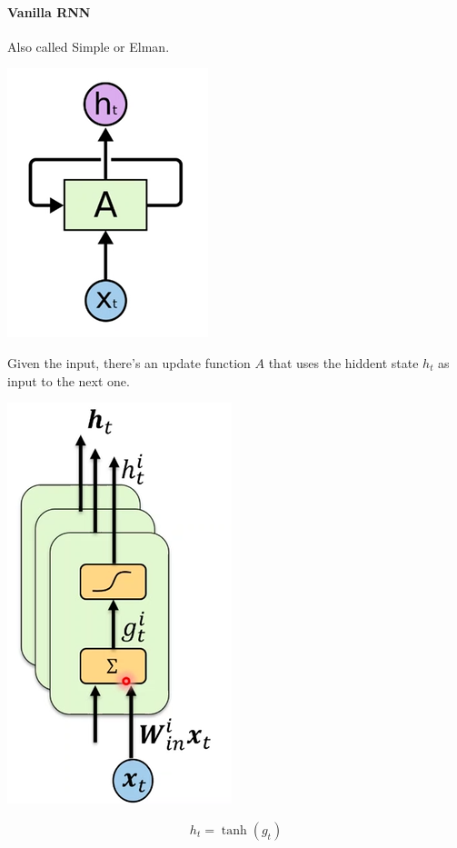 \documentclass[10pt]{report}
\begin{document}
\paragraph{Vanilla RNN} Also called Simple or Elman.
\begin{center}
	\includegraphics[scale=0.5]{90.png}
\end{center}
Given the input, there's an update function $A$ that uses the hiddent state $h_t$ as input to the next one.
\begin{center}
	\includegraphics[scale=0.5]{91.png}
\end{center}
$$h_t=\tanh(g_t)$$ %
\end{document}
